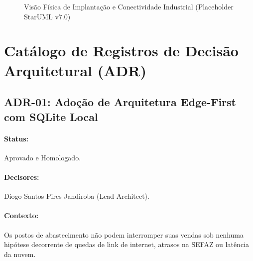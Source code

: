 \begin{figure}[htbp]
    \centering
    \caption{Visão Física de Implantação e Conectividade Industrial (Placeholder StarUML v7.0)}
    \label{fig:visao_implantacao_posto}
\end{figure}

\section{Catálogo de Registros de Decisão Arquitetural (ADR)}

\subsection{ADR-01: Adoção de Arquitetura Edge-First com SQLite Local}
\paragraph{Status:} Aprovado e Homologado.
\paragraph{Decisores:} Diogo Santos Pires Jandiroba (Lead Architect).
\paragraph{Contexto:} Os postos de abastecimento não podem interromper suas vendas sob nenhuma hipótese decorrente de quedas de link de internet, atrasos na SEFAZ ou latência da nuvem.
